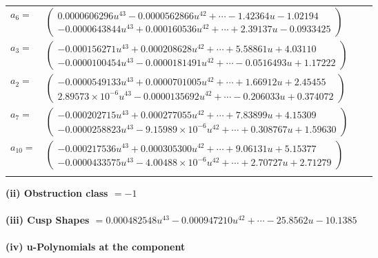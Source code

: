 \documentclass[1p]{elsarticle_modified}
\theoremstyle{definition}
\begin{document}
\begin{tabular}{m{7pt} m{180pt} m{7pt} m{180pt} }
\flushright $a_{6}=$&$\begin{pmatrix}0.0000606296 u^{43}-0.0000562866 u^{42}+\cdots-1.42364 u-1.02194\\-0.0000643844 u^{43}+0.000160536 u^{42}+\cdots+2.39137 u-0.0933425\end{pmatrix}$ \\
\flushright $a_{3}=$&$\begin{pmatrix}-0.000156271 u^{43}+0.000208628 u^{42}+\cdots+5.58861 u+4.03110\\-0.0000100454 u^{43}-0.0000181491 u^{42}+\cdots-0.0516493 u+1.17222\end{pmatrix}$ \\
\flushright $a_{2}=$&$\begin{pmatrix}-0.0000549133 u^{43}+0.0000701005 u^{42}+\cdots+1.66912 u+2.45455\\2.89573\times10^{-6} u^{43}-0.0000135692 u^{42}+\cdots-0.206033 u+0.374072\end{pmatrix}$ \\
\flushright $a_{7}=$&$\begin{pmatrix}-0.000202715 u^{43}+0.000277055 u^{42}+\cdots+7.83899 u+4.15309\\-0.0000258823 u^{43}-9.15989\times10^{-6} u^{42}+\cdots+0.308767 u+1.59630\end{pmatrix}$ \\
\flushright $a_{10}=$&$\begin{pmatrix}-0.000217536 u^{43}+0.000305300 u^{42}+\cdots+9.06131 u+5.15377\\-0.0000433575 u^{43}-4.00488\times10^{-6} u^{42}+\cdots+2.70727 u+2.71279\end{pmatrix}$\\&\end{tabular}
\flushleft \textbf{(ii) Obstruction class $= -1$}\\~\\
\flushleft \textbf{(iii) Cusp Shapes $= 0.000482548 u^{43}-0.000947210 u^{42}+\cdots-25.8562 u-10.1385$}\\~\\
\newpage\renewcommand{\arraystretch}{1}
\flushleft \textbf{(iv) u-Polynomials at the component}\newline \\
\end{document}
